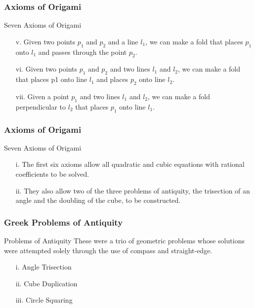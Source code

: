 \documentclass{beamer}
\begin{document}
\begin{frame}
\frametitle{Axioms of Origami}
\begin{block}{Seven Axioms of Origami}
\begin{enumerate}
\item[v.]
Given two points $p_1$ and $p_2$ and a line $l_1$, we can make a fold that places $p_1$ onto $l_1$ and passes through the point $p_2$.
\item[vi.]
Given two points $p_1$ and $p_2$ and two lines $l_1$ and $l_2$, we can make a fold that places p1 onto line $l_1$ and places $p_2$ onto line $l_2$.
\item[vii.]
Given a point $p_1$ and two lines $l_1$ and $l_2$, we can make a fold perpendicular to $l_2$ that places $p_1$ onto line $l_1$.
\end{enumerate}
\end{block}
\end{frame}

\begin{frame}
\frametitle{Axioms of Origami}
\begin{block}{Seven Axioms of Origami}
\begin{enumerate}
\item[i.]
The first six axioms allow all quadratic and cubic equations with rational coefficients to be solved.
\item[ii.]
They also allow two of the three problems of antiquity, the trisection of an angle and the doubling of the cube, to be constructed.
\end{enumerate}
\end{block}
\end{frame}

\begin{frame}
\frametitle{Greek Problems of Antiquity}
\begin{block}{Problems of Antiquity}
These were a trio of geometric problems whose solutions were attempted solely through the use of compass and straight-edge.
\begin{enumerate}
\item[i.]
Angle Trisection
\item[ii.]
Cube Duplication
\item[iii.]
Circle Squaring
\end{enumerate}
\end{block}
\end{frame}
\end{document}
